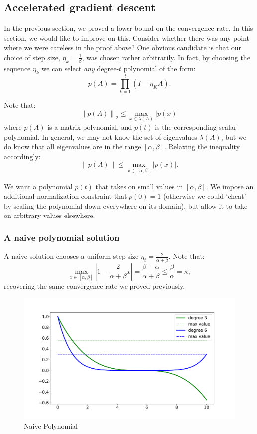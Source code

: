 \subsection{Accelerated gradient descent}
In the previous section, we proved a lower bound on the convergence rate. In this section, we would like to improve on this. Consider whether there was any point where we were careless in the proof above? One obvious candidate is that our choice of step size, $\eta_k = \frac{1}{\beta}$, was chosen rather arbitrarily. In fact, by choosing the sequence $\eta_k$ we can select \textit{any} degree-$t$ polynomial of the form:
\[
p(A) = \prod_{k=1}^t \left(I - \eta_K A\right).
\]

Note that:
\begin{equation*}
\left\|p(A)\right\|_2 \leq \max_{x \in \lambda(A)} \left|p(x)\right|
\end{equation*}
where $p(A)$ is a matrix polynomial, and $p(t)$ is the corresponding scalar polynomial. In general, we may not know the set of eigenvalues $\lambda(A)$, but we do know that all eigenvalues are in the range $[\alpha, \beta]$. Relaxing the inequality accordingly:
\begin{equation*}
\left\|p(A)\right\| \leq \max_{x \in [\alpha, \beta]} \left|p(x)\right|.
\end{equation*}

We want a polynomial $p(t)$ that takes on small values in $[\alpha, \beta]$. We impose an additional normalization constraint that $p(0) = 1$ (otherwise we could `cheat' by scaling the polynomial down everywhere on its domain), but allow it to take on arbitrary values elsewhere.

\subsubsection{A naive polynomial solution}
A naive solution chooses a uniform step size $\eta_t = \frac{2}{\alpha + \beta}$. Note that:
\[
\max_{x \in [\alpha, \beta]} \left|1 - \frac{2}{\alpha + \beta} x\right| = \frac{\beta - \alpha}{\alpha + \beta} \leq \frac{\beta}{\alpha} = \kappa,
\]
recovering the same convergence rate we proved previously.
\begin{figure}[h]
\includegraphics[width=15cm]{figures/lecture6-naive_polynome.pdf}
\centering
\caption{Naive Polynomial}
\label{naive_p}
\end{figure}


